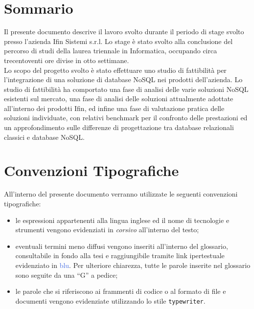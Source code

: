 
\cleardoublepage
{}
{}
\begingroup
\let\clearpage\relax
\let\cleardoublepage\relax
\let\cleardoublepage\relax

\chapter*{Sommario}

Il presente documento descrive il lavoro svolto durante il periodo di stage svolto presso l'azienda Ifin Sistemi s.r.l. Lo stage è stato svolto alla conclusione del percorso di studi della laurea triennale in Informatica, occupando circa trecentoventi ore divise in otto settimane.\\
Lo scopo del progetto svolto è stato effettuare uno studio di fattibilità per l’integrazione di una soluzione di database NoSQL nei prodotti dell'azienda. Lo studio di fattibilità ha comportato una fase di analisi delle varie soluzioni NoSQL esistenti sul mercato, una fase di analisi delle soluzioni attualmente adottate all'interno dei prodotti Ifin, ed infine una fase di valutazione pratica delle soluzioni individuate, con relativi benchmark per il confronto delle prestazioni ed un approfondimento sulle differenze di progettazione tra database relazionali classici e database NoSQL.

\vfill

\chapter*{Convenzioni Tipografiche}

All'interno del presente documento verranno utilizzate le seguenti convenzioni tipografiche:
\begin{itemize}
    \item le espressioni appartenenti alla lingua inglese ed il nome di tecnologie e strumenti vengono evidenziati in \textit{corsivo} all'interno del testo;
    \item eventuali termini meno diffusi vengono inseriti all'interno del glossario, consultabile in fondo alla tesi e raggiungibile tramite link ipertestuale evidenziato in \textcolor{RoyalBlue}{blu}. Per ulteriore chiarezza, tutte le parole inserite nel glossario sono seguite da una ``G'' a pedice;
    \item le parole che si riferiscono ai frammenti di codice o al formato di file e documenti vengono evidenziate utilizzando lo stile \texttt{typewriter}.
\end{itemize}


%
%

\endgroup			

\vfill

